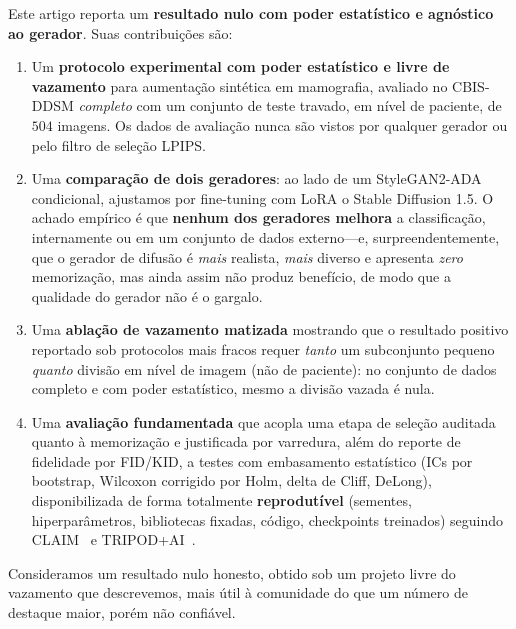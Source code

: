 \documentclass[runningheads]{llncs}
\begin{document}
Este artigo reporta um \textbf{resultado nulo com poder estatístico e agnóstico
ao gerador}. Suas contribuições são:
\begin{enumerate}
  \item Um \textbf{protocolo experimental com poder estatístico e livre de
  vazamento} para aumentação sintética em mamografia, avaliado no CBIS-DDSM
  \emph{completo} com um conjunto de teste travado, em nível de paciente, de
  $504$ imagens. Os dados de avaliação nunca são vistos por qualquer gerador ou
  pelo filtro de seleção LPIPS.
  \item Uma \textbf{comparação de dois geradores}: ao lado de um StyleGAN2-ADA
  condicional, ajustamos por fine-tuning com LoRA o Stable Diffusion 1.5. O
  achado empírico é que \textbf{nenhum dos geradores melhora} a classificação,
  internamente ou em um conjunto de dados externo---e, surpreendentemente, que o
  gerador de difusão é \emph{mais} realista, \emph{mais} diverso e apresenta
  \emph{zero} memorização, mas ainda assim não produz benefício, de modo que a
  qualidade do gerador não é o gargalo.
  \item Uma \textbf{ablação de vazamento matizada} mostrando que o resultado
  positivo reportado sob protocolos mais fracos requer \emph{tanto} um
  subconjunto pequeno \emph{quanto} divisão em nível de imagem (não de paciente):
  no conjunto de dados completo e com poder estatístico, mesmo a divisão vazada é
  nula.
  \item Uma \textbf{avaliação fundamentada} que acopla uma etapa de seleção
  auditada quanto à memorização e justificada por varredura, além do reporte de
  fidelidade por FID/KID, a testes com embasamento estatístico (ICs por
  bootstrap, Wilcoxon corrigido por Holm, delta de Cliff, DeLong),
  disponibilizada de forma totalmente \textbf{reprodutível} (sementes,
  hiperparâmetros, bibliotecas fixadas, código, checkpoints treinados) seguindo
  CLAIM~\cite{mongan2020claim} e TRIPOD+AI~\cite{collins2024tripodai}.
\end{enumerate}
Consideramos um resultado nulo honesto, obtido sob um projeto livre do vazamento
que descrevemos, mais útil à comunidade do que um número de destaque maior, porém
não confiável.

\end{document}
